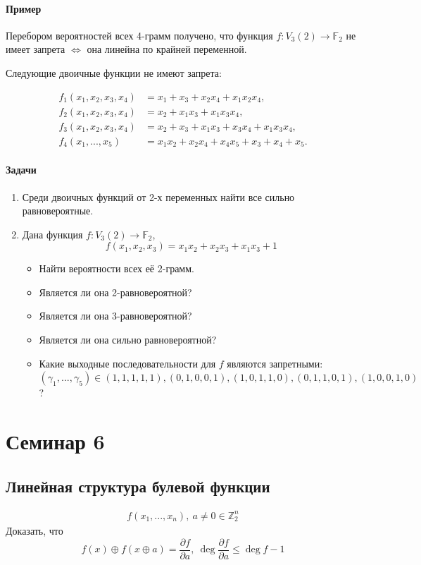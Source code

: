 \documentclass[a4paper,12pt]{article}
\newcommand{\seminary}[1]{\pagebreak\section*{#1}
    \addcontentsline{toc}{section}{#1}
}
\newcommand{\xor}{\oplus}
\newcommand{\partialfrac}[2]{\frac{\partial #1}{\partial #2}}
\newcommand{\ZZ}{\mathbb{Z}}
\begin{document}
\paragraph{Пример}
Перебором вероятностей всех 4-грамм получено, что функция $f: V_3(2) \rightarrow \mathbb{F}_2$ не имеет запрета $\Leftrightarrow$ она линейна по крайней переменной.

Следующие двоичные функции не имеют запрета:

$$
\begin{aligned}
f_1(x_1, x_2, x_3, x_4) &= x_1 + x_3 + x_2x_4 + x_1x_2x_4,\\
f_2(x_1, x_2, x_3, x_4) &= x_2 + x_1x_3 + x_1x_3x_4,\\
f_3(x_1, x_2, x_3, x_4) &= x_2 + x_3 + x_1x_3 + x_3x_4 + x_1x_3x_4, \\
f_4(x_1, ..., x_5) &= x_1x_2 + x_2x_4 + x_4x_5 + x_3 + x_4 + x_5.
\end{aligned}
$$

\paragraph{Задачи}
\begin{enumerate}
\item Среди двоичных функций от 2-х переменных найти все сильно равновероятные.
\item Дана функция $f: V_3(2) \rightarrow \mathbb{F}_2$, \[ f(x_1, x_2, x_3) = x_1x_2 + x_2x_3 + x_1x_3 + 1 \]
\begin{itemize}
    \item Найти вероятности всех её 2-грамм.
    \item Является ли она 2-равновероятной?
    \item Является ли она 3-равновероятной?
    \item Является ли она сильно равновероятной?
    \item Какие выходные последовательности для $f$ являются запретными: $(\gamma_1, ..., \gamma_5) \in {(1,1,1,1,1), (0,1,0,0,1), (1,0,1,1,0), (0,1,1,0,1), (1,0,0,1,0)}$ ?
\end{itemize}
\end{enumerate}


\seminary{Семинар 6}
\subsection{Линейная структура булевой функции}
$$
\begin{aligned}
f(x_1, ..., x_n), ~ a \not = 0 \in \ZZ_2^n
\end{aligned}
$$
Доказать, что
$$
f(x) \xor f(x \xor a) = \partialfrac{f}{a}, ~ \deg \partialfrac{f}{a} \le \deg f -1
$$
\end{document}
